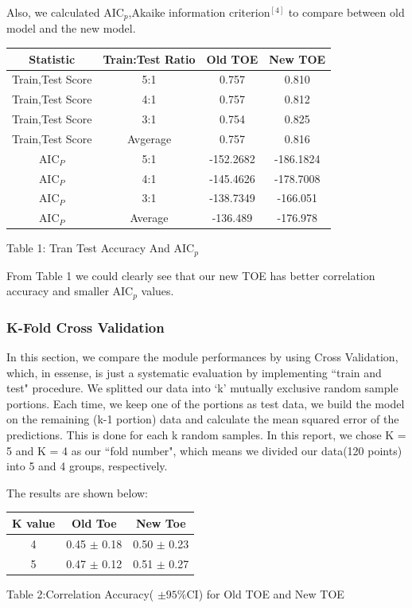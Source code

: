 \documentclass[11pt]{article}
\begin{document}
Also, we calculated AIC$_p$,Akaike information criterion$^{[4]}$ to compare between old model and the new model.

\begin{center}
\begin{tabular}{|c|c|c|c|}
\hline
Statistic & Train:Test Ratio& Old TOE & New TOE\\
\hline
Train,Test Score & 5:1 & 0.757 & 0.810\\
Train,Test Score & 4:1 & 0.757 & 0.812\\ 
Train,Test Score & 3:1 & 0.754 & 0.825\\ 
\hline
Train,Test Score & Avgerage& 0.757 & 0.816\\
\hline 
AIC$_P$& 5:1 & -152.2682 & -186.1824 \\
AIC$_P$& 4:1 & -145.4626 & -178.7008 \\
AIC$_P$& 3:1 & -138.7349 & -166.051 \\
\hline
AIC$_P$& Average & -136.489 & -176.978 \\
\hline
\end{tabular}

\bigskip
Table 1: Tran Test Accuracy And AIC$_p$
\end{center}
From Table 1 we could clearly see that our new TOE has better correlation accuracy and smaller AIC$_p$ values.

\subsubsection*{K-Fold Cross Validation}
In this section, we compare the module performances by using 
Cross Validation, which, in essense, is just a systematic evaluation by implementing ``train and test" procedure.
We splitted our data into `k' mutually exclusive random sample portions. Each time, we keep one of the portions as test data, we build the model on the remaining (k-1 portion) data and calculate the mean squared error of the predictions. This is done for each k random samples.
In this report, we chose K = 5 and K = 4 as our ``fold number", which means we divided our data(120 points) into 5 and 4 groups, respectively.

The results are shown below:

\begin{center}
\begin{tabular}{|c|c|c|}
\hline
 K value & Old Toe & New Toe \\
\hline
 4 & 0.45 $\pm$ 0.18 & 0.50 $\pm$ 0.23\\
 5 & 0.47 $\pm$ 0.12 & 0.51 $\pm$ 0.27 \\
\hline
\end{tabular}
\bigskip

Table 2:Correlation Accuracy( $\pm 95\%$CI) for Old TOE and New TOE
\end{center}
\end{document}
